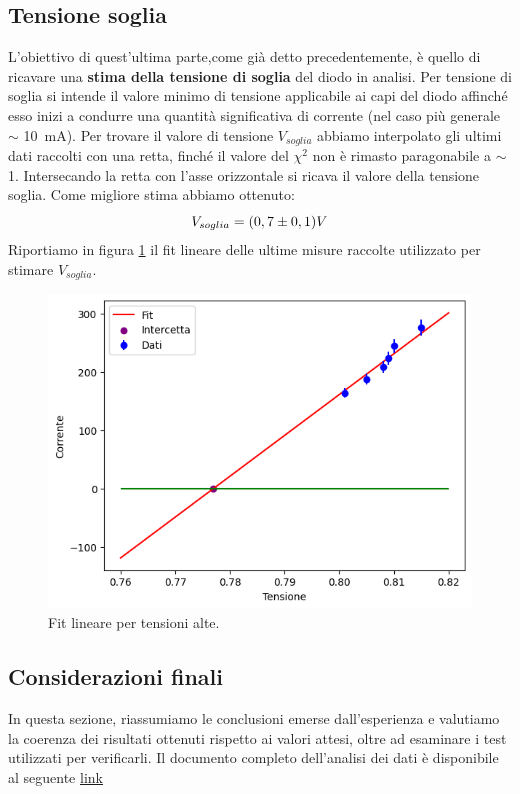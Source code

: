 \documentclass[letterpaper,12pt]{article}
\begin{document}
\newpage

\subsection{Tensione soglia}
L'obiettivo di quest'ultima parte,come già detto precedentemente, è quello di ricavare una \textbf{stima della tensione di soglia} del diodo in analisi. Per tensione di soglia si intende il valore minimo di tensione applicabile ai capi del diodo affinché esso inizi a condurre una quantità significativa di corrente (nel caso più generale $\sim$ \SI{10}{\milli\ampere}).
Per trovare il valore di tensione $V_{soglia}$ abbiamo interpolato gli ultimi dati raccolti con una retta, finché il valore del $\chi^{2}$ non è rimasto paragonabile a $\sim$1. Intersecando la retta con l'asse orizzontale si ricava il valore della tensione soglia. Come migliore stima abbiamo ottenuto: 
\begin{equation}
    V_{soglia} = (0,7\pm0,1) V
    \label{tensione soglia}
    \notag
\end{equation}
Riportiamo in figura \ref{fig:tensione soglia} il fit lineare delle ultime misure raccolte utilizzato per stimare $V_{soglia}$.

\begin{figure}[htbp]
    \centering
    \includegraphics[width=.7\textwidth]{tensioni_alte_shockley.png}
    \caption{Fit lineare per tensioni alte.}
    \label{fig:tensione soglia}
\end{figure}

\newpage
\subsection{Considerazioni finali}
In questa sezione, riassumiamo le conclusioni emerse dall'esperienza e valutiamo la coerenza dei risultati ottenuti rispetto ai valori attesi, oltre ad esaminare i test utilizzati per verificarli. Il documento completo dell'analisi dei dati è disponibile al seguente \href{https://colab.research.google.com/drive/184wsEQVv36AxDK5J4vkgR3OajIU9M9VG?usp=sharing}{link}
\end{document}
